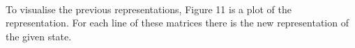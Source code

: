 \documentclass[a4paper]{article}
\begin{document}
\paragraph{}
To visualise the previous representations, Figure 11 is a plot of the representation. For each line of these matrices there is the new representation of the given state.
	\begin{figure}[h!]
    \centering
    \qquad
    \qquad
    \qquad

\end{figure}
\end{document}
